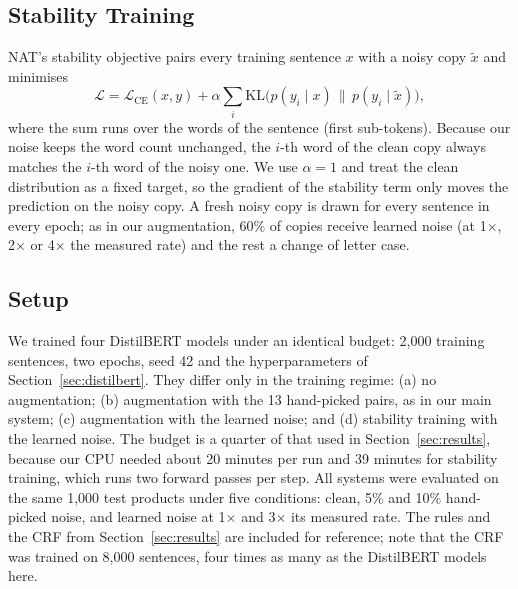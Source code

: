 \documentclass[conference]{IEEEtran}
\begin{document}
\subsection{Stability Training}
NAT's stability objective pairs every training sentence $x$ with a noisy copy $\tilde{x}$ and minimises
\begin{equation}
\mathcal{L} = \mathcal{L}_{\mathrm{CE}}(x, y) + \alpha \sum_{i} \mathrm{KL}\big(p(y_i \mid x)\,\|\,p(y_i \mid \tilde{x})\big),
\end{equation}
where the sum runs over the words of the sentence (first sub-tokens). Because our noise keeps the word count unchanged, the $i$-th word of the clean copy always matches the $i$-th word of the noisy one. We use $\alpha=1$ and treat the clean distribution as a fixed target, so the gradient of the stability term only moves the prediction on the noisy copy. A fresh noisy copy is drawn for every sentence in every epoch; as in our augmentation, 60\% of copies receive learned noise (at 1$\times$, 2$\times$ or 4$\times$ the measured rate) and the rest a change of letter case.

\subsection{Setup}
We trained four DistilBERT models under an identical budget: 2,000 training sentences, two epochs, seed 42 and the hyperparameters of Section~\ref{sec:distilbert}. They differ only in the training regime: (a) no augmentation; (b) augmentation with the 13 hand-picked pairs, as in our main system; (c) augmentation with the learned noise; and (d) stability training with the learned noise. The budget is a quarter of that used in Section~\ref{sec:results}, because our CPU needed about 20 minutes per run and 39 minutes for stability training, which runs two forward passes per step. All systems were evaluated on the same 1,000 test products under five conditions: clean, 5\% and 10\% hand-picked noise, and learned noise at 1$\times$ and 3$\times$ its measured rate. The rules and the CRF from Section~\ref{sec:results} are included for reference; note that the CRF was trained on 8,000 sentences, four times as many as the DistilBERT models here.
\end{document}
